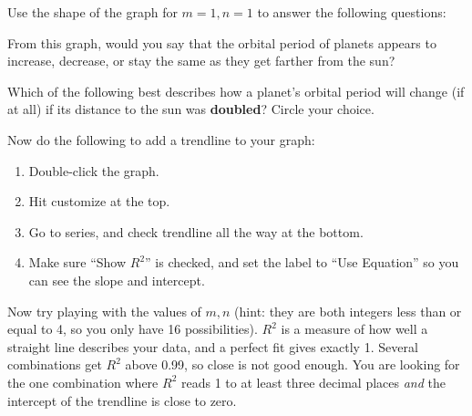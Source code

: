 \documentclass{handout}
\begin{document}
Use the shape of the graph for $m=1, n=1$ to answer the following questions:
\begin{questions}
    \question From this graph, would you say that the orbital period of planets appears to increase, decrease, or stay the same as they get farther from the sun?

    \answerspace{.8in}

    \clearpage
    \question Which of the following best describes how a planet's orbital period will change (if at all) if its distance to the sun was \textbf{doubled}? Circle your choice.
\end{questions}

Now do the following to add a trendline to your graph:
\begin{enumerate}
    \item Double-click the graph.
    \item Hit customize at the top.
    \item Go to series, and check trendline all the way at the bottom.
    \item Make sure ``Show $R^2$'' is checked, and set the label to ``Use Equation'' so you can see the slope and intercept.
\end{enumerate}

Now try playing with the values of $m,n$ (hint: they are both integers less than or equal to 4, so you only have 16 possibilities). $R^2$ is a measure of how well a straight line describes your data, and a perfect fit gives exactly 1. Several combinations get $R^2$ above 0.99, so close is not good enough. You are looking for the one combination where $R^2$ reads 1 to at least three decimal places \emph{and} the intercept of the trendline is close to zero.
\end{document}

